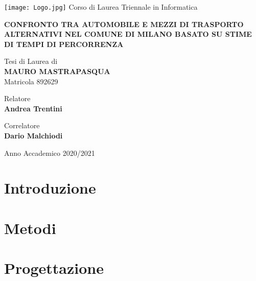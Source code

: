 \documentclass[a4paper,12pt]{report}
\newcommand\blankpage{
	\null
	\addtocounter{page}{-1}
	\thispagestyle{empty}
	\newpage
}
\begin{document}
\begin{titlepage}
\begin{center}
\texttt{[image: Logo.jpg]}
\large{Corso di Laurea Triennale in Informatica}

\vspace{1.6cm}

\Large{\textbf{CONFRONTO TRA AUTOMOBILE E MEZZI DI TRASPORTO ALTERNATIVI NEL COMUNE DI MILANO BASATO SU STIME DI TEMPI DI PERCORRENZA}}

\vspace{1.4cm}

\large{Tesi di Laurea di} \\
\large{\textbf{MAURO MASTRAPASQUA}} \\
\large{Matricola 892629}
\end{center}

\begin{flushleft}
\vspace{1.6cm}

\normalsize{Relatore} \\
\normalsize{\textbf{Andrea Trentini}}

\vspace{0.4cm}

\normalsize{Correlatore} \\
\normalsize{\textbf{Dario Malchiodi}}
\end{flushleft}

\begin{center}
\vspace{1.6cm}

\large{Anno Accademico 2020/2021}
\end{center}
\end{titlepage}
\afterpage{\blankpage}

\tableofcontents

\chapter{Introduzione}


\chapter{Metodi}


\chapter{Progettazione}

\end{document}
